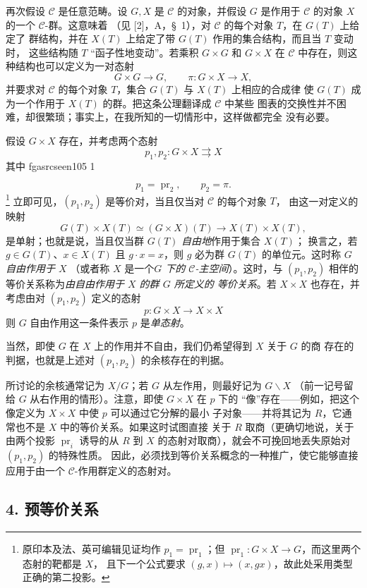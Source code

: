 \documentclass[12pt,twoside,openany]{book}
\numberwithin{equation}{section}
\newcommand{\fgaunitid}{unbound}
\newcommand{\src}[1]{%
  \phantomsection
  \hypertarget{src:\fgaunitid:#1}{}%
  \hypertarget{fga.\fgaunitid.p#1}{}%
  \ifcsname fgasrcseen#1\endcsname\else
    \expandafter\gdef\csname fgasrcseen#1\endcsname{1}%
    \hypertarget{src:#1}{}%
  \fi
  \marginpar{\raggedleft\footnotesize\sffamily #1}%
}
\theoremstyle{plain}
\theoremstyle{definition}
\theoremstyle{remark}
\begin{document}
再次假设 $\mathcal C$ 是任意范畴。设 $G,X$ 是 $\mathcal C$ 的对象，并假设
$G$ 是作用于 $\mathcal C$ 的对象 $X$ 的一个 $\mathcal C$-群。这意味着
（见 [2]，A，\S~1），对 $\mathcal C$ 的每个对象 $T$，在 $G(T)$ 上给定了
群结构，并在 $X(T)$ 上给定了带 $G(T)$ 作用的集合结构，而且当 $T$ 变动时，
这些结构随 $T$ “函子性地变动”。若乘积 $G\times G$ 和 $G\times X$ 在
$\mathcal C$ 中存在，则这种结构也可以定义为一对态射
\[
  G\times G\longrightarrow G,
  \qquad \pi:G\times X\longrightarrow X,
\]
并要求对 $\mathcal C$ 的每个对象 $T$，集合 $G(T)$ 与 $X(T)$ 上相应的合成律
使 $G(T)$ 成为一个作用于 $X(T)$ 的群。把这条公理翻译成 $\mathcal C$ 中某些
图表的交换性并不困难，却很繁琐；事实上，在我所知的一切情形中，这样做都完全
没有必要。

假设 $G\times X$ 存在，并考虑两个态射
\[
  p_1,p_2:G\times X\rightrightarrows X
\]
其中
\src{105}
\[
  p_1=\operatorname{pr}_2,\qquad p_2=\pi.
\]
\footnote{原印本及法、英可编辑见证均作
$p_1=\operatorname{pr}_1$；但
$\operatorname{pr}_1:G\times X\to G$，而这里两个态射的靶都是 $X$，
且下一个公式要求 $(g,x)\mapsto(x,gx)$，故此处采用类型正确的第二投影。}
立即可见，$(p_1,p_2)$ 是等价对，当且仅当对 $\mathcal C$ 的每个对象 $T$，
由这一对定义的映射
\[
  G(T)\times X(T)\simeq(G\times X)(T)
  \longrightarrow X(T)\times X(T),
\]
是单射；也就是说，当且仅当群 $G(T)$ \emph{自由地}作用于集合 $X(T)$；
换言之，若 $g\in G(T)$、$x\in X(T)$ 且 $g\cdot x=x$，则 $g$ 必为群
$G(T)$ 的单位元。这时称 $G$ \emph{自由作用于 $X$}
（或者称 $X$ 是一个\emph{$G$ 下的 $\mathcal C$-主空间}）。这时，与
$(p_1,p_2)$ 相伴的等价关系称为\emph{由自由作用于 $X$ 的群 $G$ 所定义的
等价关系}。若 $X\times X$ 也存在，并考虑由对 $(p_1,p_2)$ 定义的态射
\[
  p:G\times X\longrightarrow X\times X
\]
则 $G$ 自由作用这一条件表示 $p$ 是\emph{单态射}。

当然，即使 $G$ 在 $X$ 上的作用并不自由，我们仍希望得到 $X$ 关于 $G$ 的商
存在的判据，也就是上述对 $(p_1,p_2)$ 的余核存在的判据。

所讨论的余核通常记为 $X/G$；若 $G$ 从左作用，则最好记为 $G\backslash X$
（前一记号留给 $G$ 从右作用的情形）。注意，即使 $G\times X$ 在 $p$ 下的
“像”存在——例如，把这个像定义为 $X\times X$ 中使 $p$ 可以通过它分解的最小
子对象——并将其记为 $R$，它通常也不是 $X$ 中的等价关系。如果这时试图直接
关于 $R$ 取商（更确切地说，关于由两个投影 $\operatorname{pr}_i$ 诱导的从
$R$ 到 $X$ 的态射对取商），就会不可挽回地丢失原始对 $(p_1,p_2)$ 的特殊性质。
因此，必须找到等价关系概念的一种推广，使它能够直接应用于由一个
$\mathcal C$-作用群定义的态射对。

\subsection*{4. 预等价关系}
\end{document}

